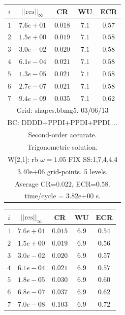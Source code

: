 \begin{table}[hbt]
\begin{center}
{\tablefontsize
\begin{tabular}{|c|c|c|c|c|} \hline 
 $i$   & $\vert\vert\mbox{res}\vert\vert_\infty$  &  CR     &  WU    & ECR  \\   \hline 
 $ 1$  & $ 7.6e+01$ & $0.018$ & $ 7.1$ & $0.57$ \\ 
 $ 2$  & $ 1.5e+00$ & $0.019$ & $ 7.1$ & $0.58$ \\ 
 $ 3$  & $ 3.0e-02$ & $0.020$ & $ 7.1$ & $0.58$ \\ 
 $ 4$  & $ 6.1e-04$ & $0.021$ & $ 7.1$ & $0.58$ \\ 
 $ 5$  & $ 1.3e-05$ & $0.021$ & $ 7.1$ & $0.58$ \\ 
 $ 6$  & $ 2.7e-07$ & $0.021$ & $ 7.1$ & $0.58$ \\ 
 $ 7$  & $ 9.4e-09$ & $0.035$ & $ 7.1$ & $0.62$ \\ 
\hline 
\multicolumn{5}{|c|}{Grid: shapes.bbmg5. 03/06/13}  \\
\multicolumn{5}{|c|}{BC: DDDD+PPDI+PPDI+PPDI....}  \\
\multicolumn{5}{|c|}{Second-order accurate.}  \\
\multicolumn{5}{|c|}{Trigonometric solution.}  \\
\multicolumn{5}{|c|}{W[2,1]: rb $\omega=1.05$ FIX SS:1,7,4,4,4}  \\
\multicolumn{5}{|c|}{3.40e+06 grid-points. 5 levels.}  \\
\multicolumn{5}{|c|}{Average CR=$0.022$, ECR=$0.58$.}  \\
\multicolumn{5}{|c|}{time/cycle = 3.82e+00 s.}  \\
\hline 
\end{tabular}
\begin{tabular}{|c|c|c|c|c|} \hline 
 $i$   & $\vert\vert\mbox{res}\vert\vert_\infty$  &  CR     &  WU    & ECR  \\   \hline 
 $ 1$  & $ 7.6e+01$ & $0.015$ & $ 6.9$ & $0.54$ \\ 
 $ 2$  & $ 1.5e+00$ & $0.019$ & $ 6.9$ & $0.56$ \\ 
 $ 3$  & $ 3.0e-02$ & $0.020$ & $ 6.9$ & $0.57$ \\ 
 $ 4$  & $ 6.1e-04$ & $0.021$ & $ 6.9$ & $0.57$ \\ 
 $ 5$  & $ 1.8e-05$ & $0.030$ & $ 6.9$ & $0.60$ \\ 
 $ 6$  & $ 6.8e-07$ & $0.037$ & $ 6.9$ & $0.62$ \\ 
 $ 7$  & $ 7.0e-08$ & $0.103$ & $ 6.9$ & $0.72$ \\ 

\end{tabular}}
\end{center}
\end{table}
